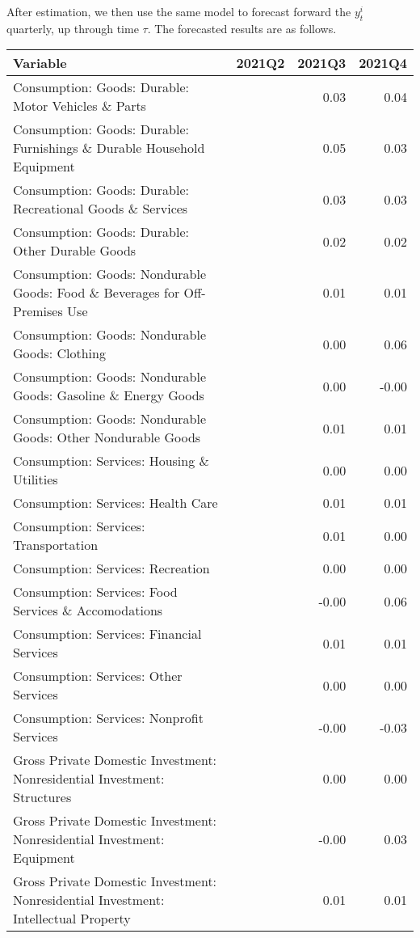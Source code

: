 \documentclass[11pt, letterpaper]{article}\usepackage[]{graphicx}\usepackage[]{color}
\begin{document}
After estimation, we then use the same model to forecast forward the $y^i_t$ quarterly, up through time $\tau$. 
The forecasted results are as follows.
\begin{table}[H]
\centering
\begingroup\scriptsize
\begin{tabular}{lrrr}
  \hline
Variable & 2021Q2 & 2021Q3 & 2021Q4 \\ 
  \hline
Consumption: Goods: Durable: Motor Vehicles \& Parts &  & 0.03 & 0.04 \\ 
  Consumption: Goods: Durable: Furnishings \& Durable Household Equipment &  & 0.05 & 0.03 \\ 
  Consumption: Goods: Durable: Recreational Goods \& Services &  & 0.03 & 0.03 \\ 
  Consumption: Goods: Durable: Other Durable Goods &  & 0.02 & 0.02 \\ 
  Consumption: Goods: Nondurable Goods: Food \& Beverages for Off-Premises Use &  & 0.01 & 0.01 \\ 
  Consumption: Goods: Nondurable Goods: Clothing &  & 0.00 & 0.06 \\ 
  Consumption: Goods: Nondurable Goods: Gasoline \& Energy Goods &  & 0.00 & -0.00 \\ 
  Consumption: Goods: Nondurable Goods: Other Nondurable Goods &  & 0.01 & 0.01 \\ 
  Consumption: Services: Housing \& Utilities &  & 0.00 & 0.00 \\ 
  Consumption: Services: Health Care &  & 0.01 & 0.01 \\ 
  Consumption: Services: Transportation &  & 0.01 & 0.00 \\ 
  Consumption: Services: Recreation &  & 0.00 & 0.00 \\ 
  Consumption: Services: Food Services \& Accomodations &  & -0.00 & 0.06 \\ 
  Consumption: Services: Financial Services &  & 0.01 & 0.01 \\ 
  Consumption: Services: Other Services &  & 0.00 & 0.00 \\ 
  Consumption: Services: Nonprofit Services &  & -0.00 & -0.03 \\ 
  Gross Private Domestic Investment: Nonresidential Investment: Structures &  & 0.00 & 0.00 \\ 
  Gross Private Domestic Investment: Nonresidential Investment: Equipment &  & -0.00 & 0.03 \\ 
  Gross Private Domestic Investment: Nonresidential Investment: Intellectual Property &  & 0.01 & 0.01 \\ 

\end{tabular}
\end{table}
\end{document}
